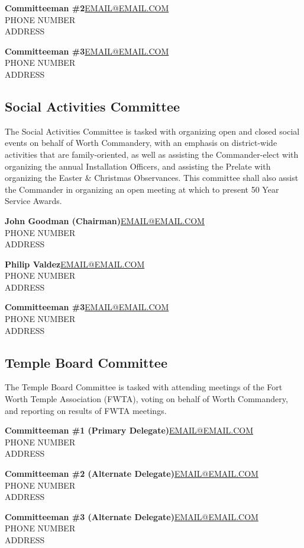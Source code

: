 \documentclass[letterpaper]{article}
\newcommand{\cman}[4]{\textbf{#1}\hfill{}\url{#2}\\\hphantom{0em}\hfill{}#3\\\hphantom{0em}\hfill{}#4}
\newcommand{\comm}[3]{\subsection*{#1 Committee\textsuperscript{#2}}The #1 Committee is tasked with #3\bigskip}
\begin{document}
		\cman{Committeeman \#2}{EMAIL@EMAIL.COM}{PHONE NUMBER}{ADDRESS}
		
		\cman{Committeeman \#3}{EMAIL@EMAIL.COM}{PHONE NUMBER}{ADDRESS}
	
	\pagebreak
	
	\comm{Social Activities}{}{organizing open and closed social events on behalf of Worth Commandery, with an emphasis on district-wide activities that are family-oriented, as well as assisting the Commander-elect with organizing the annual Installation Officers, and assisting the Prelate with organizing the Easter \& Christmas Observances. This committee shall also assist the Commander in organizing an open meeting at which to present 50 Year Service Awards.}
	
		\cman{John Goodman (Chairman)}{EMAIL@EMAIL.COM}{PHONE NUMBER}{ADDRESS}
		
		\cman{Philip Valdez}{EMAIL@EMAIL.COM}{PHONE NUMBER}{ADDRESS}
		
		\cman{Committeeman \#3}{EMAIL@EMAIL.COM}{PHONE NUMBER}{ADDRESS}
	
	\pagebreak
	
	\comm{Temple Board}{}{attending meetings of the Fort Worth Temple Association (FWTA), voting on behalf of Worth Commandery, and reporting on results of FWTA meetings.}
	
		\cman{Committeeman \#1 (Primary Delegate)}{EMAIL@EMAIL.COM}{PHONE NUMBER}{ADDRESS}
		
		\cman{Committeeman \#2 (Alternate Delegate)}{EMAIL@EMAIL.COM}{PHONE NUMBER}{ADDRESS}
		
		\cman{Committeeman \#3 (Alternate Delegate)}{EMAIL@EMAIL.COM}{PHONE NUMBER}{ADDRESS}
\end{document}
